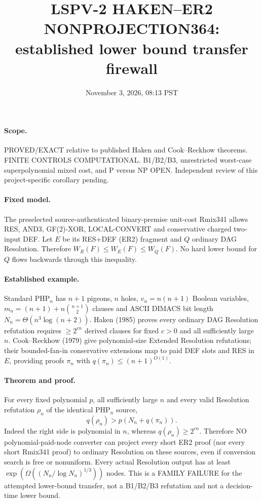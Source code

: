 \documentclass{article}
\title{LSPV-2 HAKEN--ER2 NONPROJECTION364: established lower bound transfer firewall}
\date{November 3, 2026, 08:13 PST}
\begin{document}
\maketitle
\paragraph{Scope.} PROVED/EXACT relative to published Haken and Cook--Reckhow theorems. FINITE CONTROLS COMPUTATIONAL. B1/B2/B3, unrestricted worst-case superpolynomial mixed cost, and P versus NP OPEN. Independent review of this project-specific corollary pending.
\paragraph{Fixed model.} The preselected source-authenticated binary-premise unit-cost Rmix341 allows RES, AND3, GF(2)-XOR, LOCAL-CONVERT and conservative charged two-input DEF. Let $E$ be its RES+DEF (ER2) fragment and $Q$ ordinary DAG Resolution. Therefore $W_R(F)\le W_E(F)\le W_Q(F)$. No hard lower bound for $Q$ flows backwards through this inequality.
\paragraph{Established example.} Standard $\mathrm{PHP}_n$ has $n+1$ pigeons, $n$ holes, $v_n=n(n+1)$ Boolean variables, $m_n=(n+1)+n\binom{n+1}{2}$ clauses and ASCII DIMACS bit length $N_n=\Theta(n^3\log(n+2))$. Haken (1985) proves every ordinary DAG Resolution refutation requires $\ge2^{cn}$ derived clauses for fixed $c>0$ and all sufficiently large $n$. Cook--Reckhow (1979) give polynomial-size Extended Resolution refutations; their bounded-fan-in conservative extensions map to paid DEF slots and RES in $E$, providing proofs $\pi_n$ with $q(\pi_n)\le(n+1)^{O(1)}$.
\paragraph{Theorem and proof.} For every fixed polynomial $p$, all sufficiently large $n$ and every valid Resolution refutation $\rho_n$ of the identical $\mathrm{PHP}_n$ source,
\[
q(\rho_n)>p(N_n+q(\pi_n)).
\]
Indeed the right side is polynomial in $n$, whereas $q(\rho_n)\ge2^{cn}$. Therefore NO polynomial-paid-node converter can project every short ER2 proof (nor every short Rmix341 proof) to ordinary Resolution on these sources, even if conversion search is free or nonuniform. Every actual Resolution output has at least $\exp(\Omega((N_n/\log N_n)^{1/3}))$ nodes. This is a FAMILY FAILURE for the attempted lower-bound transfer, not a B1/B2/B3 refutation and not a decision-time lower bound.
\end{document}
